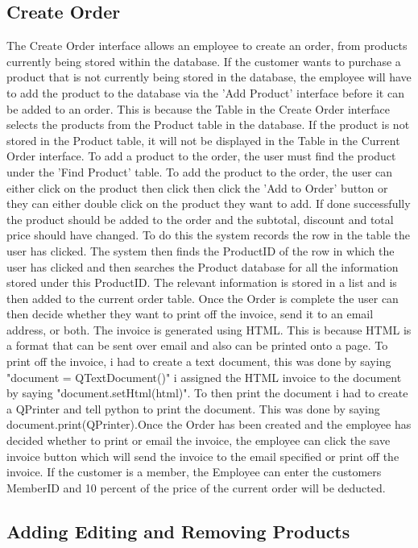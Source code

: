 \subsection{Create Order}

The Create Order interface allows an employee to create an order, from products currently being stored within the database. If the customer wants to purchase a product that is not currently being stored in the database, the employee will have to add the product to the database via the 'Add Product' interface before it can be added to an order. This is because the Table in the Create Order interface selects the products from the Product table in the database. If the product is not stored in the Product table, it will not be displayed in the Table in the Current Order interface. To add a product to the order, the user must find the product under the 'Find Product' table. To add the product to the order, the user can either click on the product then click then click the 'Add to Order' button or they can either double click on the product they want to add. If done successfully the product should be added to the order and the subtotal, discount and total price should have changed. To do this the system records the row in the table the user has clicked. The system then finds the ProductID of the row in which the user has clicked and then searches the Product database for all the information stored under this ProductID. The relevant information is stored in a list and is then added to the current order table. Once the Order is complete the user can then decide whether they want to print off the invoice, send it to an email address, or both. The invoice is generated using HTML. This is because HTML is a format that can be sent over email and also can be printed onto a page. To print off the invoice, i had to create a text document, this was done by saying "document = QTextDocument()" i assigned the HTML invoice to the document by saying "document.setHtml(html)". To then print the document i had to create a QPrinter and tell python to print the document. This was done by saying document.print(QPrinter).Once the Order has been created and the employee has decided whether to print or email the invoice, the employee can click the save invoice button which will send the invoice to the email specified or print off the invoice. If the customer is a member, the Employee can enter the customers MemberID and 10 percent of the price of the current order will be deducted.

\subsection{Adding Editing and Removing Products}

